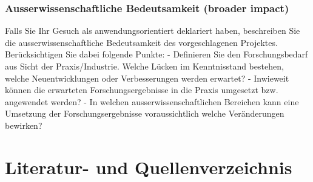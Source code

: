 \documentclass[11pt,ngerman,a4paper,]{scrartcl}
\begin{document}
\hypertarget{ausserwissenschaftliche-bedeutsamkeit-broader-impact}{%
\subsubsection{Ausserwissenschaftliche Bedeutsamkeit (broader
impact)}\label{ausserwissenschaftliche-bedeutsamkeit-broader-impact}}

Falls Sie Ihr Gesuch als anwendungsorientiert deklariert haben,
beschreiben Sie die ausserwissenschaftliche Bedeutsamkeit des
vorgeschlagenen Projektes. Berücksichtigen Sie dabei folgende Punkte: -
Definieren Sie den Forschungsbedarf aus Sicht der Praxis/Industrie.
Welche Lücken im Kenntnisstand bestehen, welche Neuentwicklungen oder
Verbesserungen werden erwartet? - Inwieweit können die erwarteten
Forschungsergebnisse in die Praxis umgesetzt bzw. angewendet werden? -
In welchen ausserwissenschaftlichen Bereichen kann eine Umsetzung der
Forschungsergebnisse voraussichtlich welche Veränderungen bewirken?

\hypertarget{literatur--und-quellenverzeichnis}{%
\section{Literatur- und
Quellenverzeichnis}\label{literatur--und-quellenverzeichnis}}
\end{document}
